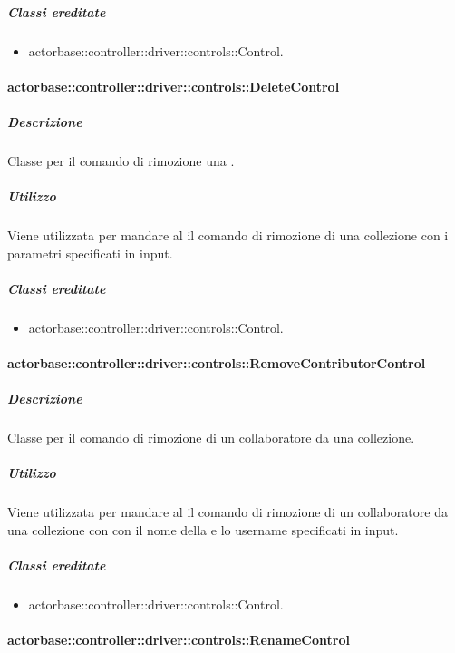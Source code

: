 \documentclass{scalatekids-article}
\begin{document}
\subparagraph{Classi ereditate}

\begin{itemize}
\item actorbase::controller::driver::controls::Control.
\end{itemize}

\paragraph{actorbase::controller::driver::controls::DeleteControl}

\subparagraph{Descrizione}

Classe per il comando di rimozione una .

\subparagraph{Utilizzo}

Viene utilizzata per mandare al  il comando di rimozione di una
collezione con i parametri specificati in input.

\subparagraph{Classi ereditate}

\begin{itemize}
\item actorbase::controller::driver::controls::Control.
\end{itemize}

\paragraph{actorbase::controller::driver::controls::RemoveContributorControl}

\subparagraph{Descrizione}

Classe per il comando di rimozione di un collaboratore da una collezione.

\subparagraph{Utilizzo}

Viene utilizzata per mandare al  il comando di rimozione di un
collaboratore da una collezione con con il nome della  e lo
username specificati in input.

\subparagraph{Classi ereditate}

\begin{itemize}
\item actorbase::controller::driver::controls::Control.
\end{itemize}

\paragraph{actorbase::controller::driver::controls::RenameControl}
\end{document}
